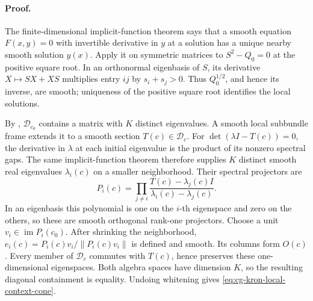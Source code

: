\paragraph{Proof.}
The finite-dimensional implicit-function theorem says that a smooth
equation \(F(x,y)=0\) with invertible derivative in \(y\) at a solution
has a unique nearby smooth solution \(y(x)\). Apply it on symmetric
matrices to \(S^2-Q_0=0\) at the positive square root. In an
orthonormal eigenbasis of \(S\), its derivative
\(X\mapsto SX+XS\) multiplies entry \(ij\) by \(s_i+s_j>0\).
Thus \(Q_0^{1/2}\), and hence its inverse, are smooth; uniqueness of
the positive square root identifies the local solutions.

By , \(\mathscr D_{c_0}\)
contains a matrix with \(K\) distinct eigenvalues. A smooth local
subbundle frame extends it to a smooth section \(T(c)\in\mathscr D_c\).
For \(\det(\lambda I-T(c))=0\), the derivative in \(\lambda\) at
each initial eigenvalue is the product of its nonzero spectral gaps.
The same implicit-function theorem therefore supplies \(K\) distinct
smooth real eigenvalues \(\lambda_i(c)\) on a smaller neighborhood.
Their spectral projectors are
\begin{equation}
P_i(c)=\prod_{j\ne i}
\frac{T(c)-\lambda_j(c)I}{\lambda_i(c)-\lambda_j(c)}.
\label{eq:cg-kron-smooth-projectors}
\end{equation}
In an eigenbasis this polynomial is one on the \(i\)-th eigenspace
and zero on the others, so these are smooth orthogonal rank-one
projectors. Choose a unit \(v_i\in\operatorname{im}P_i(c_0)\).
After shrinking the neighborhood,
\(e_i(c)=P_i(c)v_i/\|P_i(c)v_i\|\) is defined and smooth.
Its columns form \(O(c)\). Every member of \(\mathscr D_c\)
commutes with \(T(c)\), hence preserves these one-dimensional
eigenspaces. Both algebra spaces have dimension \(K\), so the
resulting diagonal containment is equality. Undoing whitening gives
\eqref{eq:cg-kron-local-context-cone}.

